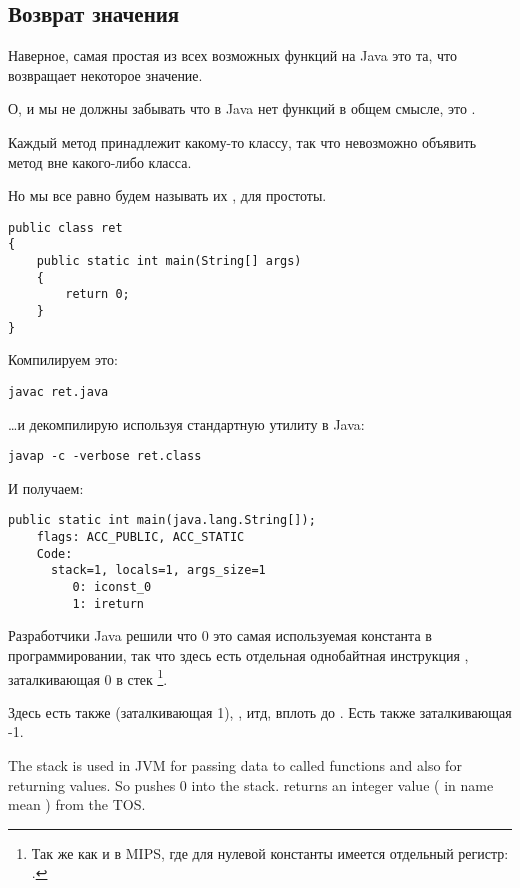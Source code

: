\subsection{Возврат значения}

Наверное, самая простая из всех возможных функций на Java это та, что возвращает 
некоторое значение.

О, и мы не должны забывать что в Java нет  функций в общем смысле,
это .

Каждый метод принадлежит какому-то классу, так что невозможно объявить метод 
вне какого-либо класса.

Но мы все равно будем называть их , для простоты.

\begin{lstlisting}
public class ret
{
	public static int main(String[] args) 
	{
		return 0;
	}
}
\end{lstlisting}

Компилируем это:

\begin{lstlisting}
javac ret.java
\end{lstlisting}

\dots и декомпилирую используя стандартную утилиту в Java:

\begin{lstlisting}
javap -c -verbose ret.class
\end{lstlisting}

И получаем:

\begin{lstlisting}[caption=JDK 1.7 (excerpt)]
  public static int main(java.lang.String[]);
    flags: ACC_PUBLIC, ACC_STATIC
    Code:
      stack=1, locals=1, args_size=1
         0: iconst_0      
         1: ireturn       
\end{lstlisting}

Разработчики Java решили что 0 это самая используемая константа в программировании,
так что здесь есть отдельная однобайтная инструкция , заталкивающая 0 в стек
\footnote{Так же как и в MIPS, где для нулевой константы имеется отдельный регистр: .}.

Здесь есть также  (заталкивающая 1), , итд, 
вплоть до .
Есть также  заталкивающая -1.

The stack is used in JVM for passing data to called functions and also for returning values.
So  pushes 0 into the stack.
 returns an integer value ( in name mean ) from the \ac{TOS}.

